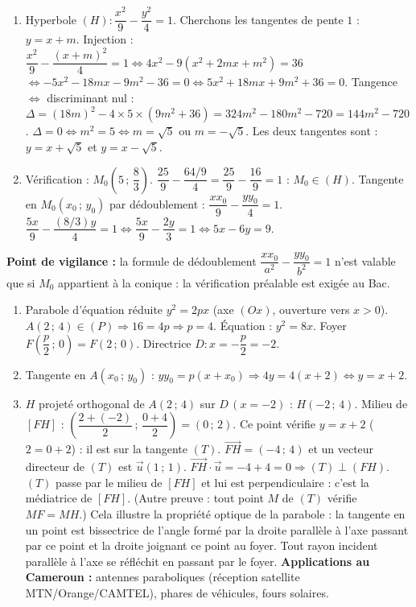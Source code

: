 \documentclass[11pt]{article}
\newcommand{\cle}[1]{{\popxbold\color{popdark}#1}}
\begin{document}
\begin{corrige}
\begin{enumerate}
\item Hyperbole $(H) : \dfrac{x^{2}}{9} - \dfrac{y^{2}}{4} = 1$. Cherchons les tangentes de pente $1$ : $y = x + m$.
  Injection : $\dfrac{x^{2}}{9} - \dfrac{(x+m)^{2}}{4} = 1 \iff 4x^{2} - 9(x^{2}+2mx+m^{2}) = 36$
  $\iff -5x^{2} - 18mx - 9m^{2} - 36 = 0 \iff 5x^{2} + 18mx + 9m^{2} + 36 = 0$.
  Tangence $\iff$ discriminant nul :
  $\Delta = (18m)^{2} - 4 \times 5 \times (9m^{2} + 36) = 324m^{2} - 180m^{2} - 720 = 144m^{2} - 720$.
  $\Delta = 0 \iff m^{2} = 5 \iff m = \sqrt{5}$ ou $m = -\sqrt{5}$.
  Les deux tangentes sont : $y = x + \sqrt{5}$ et $y = x - \sqrt{5}$.
\item Vérification : $M_{0}\left(5\,;\,\dfrac{8}{3}\right)$. $\dfrac{25}{9} - \dfrac{64/9}{4} = \dfrac{25}{9} - \dfrac{16}{9} = 1$ : $M_{0} \in (H)$.
  Tangente en $M_{0}(x_{0}\,;\,y_{0})$ par dédoublement : $\dfrac{x x_{0}}{9} - \dfrac{y y_{0}}{4} = 1$.
  $\dfrac{5x}{9} - \dfrac{(8/3)y}{4} = 1 \iff \dfrac{5x}{9} - \dfrac{2y}{3} = 1 \iff 5x - 6y = 9$.
\end{enumerate}
\textbf{Point de vigilance :} la formule de dédoublement $\dfrac{xx_{0}}{a^{2}} - \dfrac{yy_{0}}{b^{2}} = 1$ n'est valable que si $M_{0}$ appartient à la conique : la vérification préalable est exigée au Bac.
\end{corrige}

\begin{corrige}
\begin{enumerate}
\item Parabole d'équation réduite $y^{2} = 2px$ (axe $(Ox)$, ouverture vers $x>0$). $A(2\,;\,4) \in (P) \Rightarrow 16 = 4p \Rightarrow p = 4$.
  Équation : $y^{2} = 8x$. Foyer $F\left(\dfrac{p}{2}\,;\,0\right) = F(2\,;\,0)$. Directrice $D : x = -\dfrac{p}{2} = -2$.
\item Tangente en $A(x_{0}\,;\,y_{0})$ : $y y_{0} = p(x + x_{0}) \Rightarrow 4y = 4(x + 2) \iff y = x + 2$.
\item $H$ projeté orthogonal de $A(2\,;\,4)$ sur $D\,(x=-2)$ : $H(-2\,;\,4)$.
  Milieu de $[FH]$ : $\left(\dfrac{2+(-2)}{2}\,;\,\dfrac{0+4}{2}\right) = (0\,;\,2)$.
  Ce point vérifie $y = x + 2$ ($2 = 0 + 2$) : il est sur la tangente $(T)$.
  $\overrightarrow{FH} = (-4\,;\,4)$ et un vecteur directeur de $(T)$ est $\vec{u}(1\,;\,1)$.
  $\overrightarrow{FH} \cdot \vec{u} = -4 + 4 = 0 \Rightarrow (T) \perp (FH)$.
  $(T)$ passe par le milieu de $[FH]$ et lui est perpendiculaire : c'est la \cle{médiatrice} de $[FH]$.
  (Autre preuve : tout point $M$ de $(T)$ vérifie $MF = MH$.)
  Cela illustre la \cle{propriété optique de la parabole} : la tangente en un point est bissectrice de l'angle formé par la droite parallèle à l'axe passant par ce point et la droite joignant ce point au foyer. Tout rayon incident parallèle à l'axe se réfléchit en passant par le foyer.
  \textbf{Applications au Cameroun :} antennes paraboliques (réception satellite MTN/Orange/CAMTEL), phares de véhicules, fours solaires.
\end{enumerate}
\end{corrige}
\end{document}
